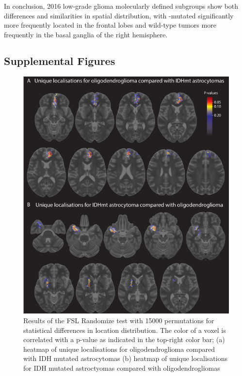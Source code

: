 In conclusion,  2016 low-grade glioma molecularly defined subgroups show both differences and similarities in spatial distribution, with -mutated  significantly more frequently located in the frontal lobes and  wild-type tumors more frequently in the basal ganglia of the right hemisphere.

\newpage
\begin{subappendices}
    \section{Supplemental Figures}

    \begin{figure}[htb]
        \centering
        \includegraphics[width=\textwidth]{Figures/p_value_oligo_astro.png}
        \caption{Results of the FSL Randomize test with 15000 permutations for statistical
        differences in location distribution. The color of a voxel is correlated with
        a p-value as indicated in the top-right color bar; (a) heatmap of unique
        localisations for oligodendroglioma compared with IDH mutated astrocytomas (b) heatmap of unique localisations for IDH mutated astroctyomas
        compared with oligodendrogliomas}\label{fig:LGG_location_oligo_astro_p_value}
    \end{figure}


\end{subappendices}
